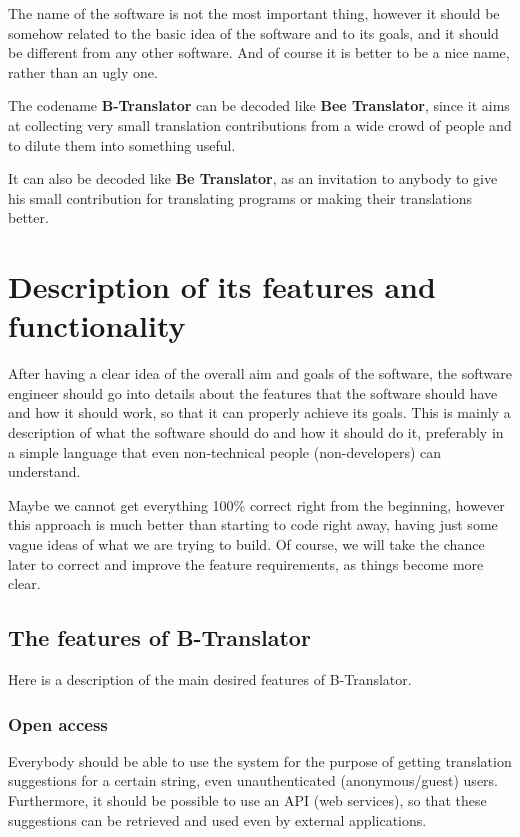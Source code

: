 \documentclass[11pt]{article}
\begin{document}
   The name of the software is not the most important thing, however
   it should be somehow related to the basic idea of the software and
   to its goals, and it should be different from any other software.
   And of course it is better to be a nice name, rather than an ugly
   one.

   The codename \textbf{B-Translator} can be decoded like \textbf{Bee Translator},
   since it aims at collecting very small translation contributions
   from a wide crowd of people and to dilute them into something
   useful.

   It can also be decoded like \textbf{Be Translator}, as an invitation to
   anybody to give his small contribution for translating programs or
   making their translations better.


\section{Description of its features and functionality}
\label{sec-3}


  After having a clear idea of the overall aim and goals of the
  software, the software engineer should go into details about the
  features that the software should have and how it should work, so
  that it can properly achieve its goals. This is mainly a description
  of what the software should do and how it should do it, preferably
  in a simple language that even non-technical people (non-developers)
  can understand.

  Maybe we cannot get everything 100\% correct right from the
  beginning, however this approach is much better than starting to
  code right away, having just some vague ideas of what we are trying
  to build. Of course, we will take the chance later to correct and
  improve the feature requirements, as things become more clear.

\subsection{The features of B-Translator}
\label{sec-3.1}


   Here is a description of the main desired features of B-Translator.

\subsubsection{Open access}
\label{sec-3.1.1}


    Everybody should be able to use the system for the purpose of
    getting translation suggestions for a certain string, even
    unauthenticated (anonymous/guest) users.  Furthermore, it should
    be possible to use an API (web services), so that these
    suggestions can be retrieved and used even by external
    applications.
\end{document}
